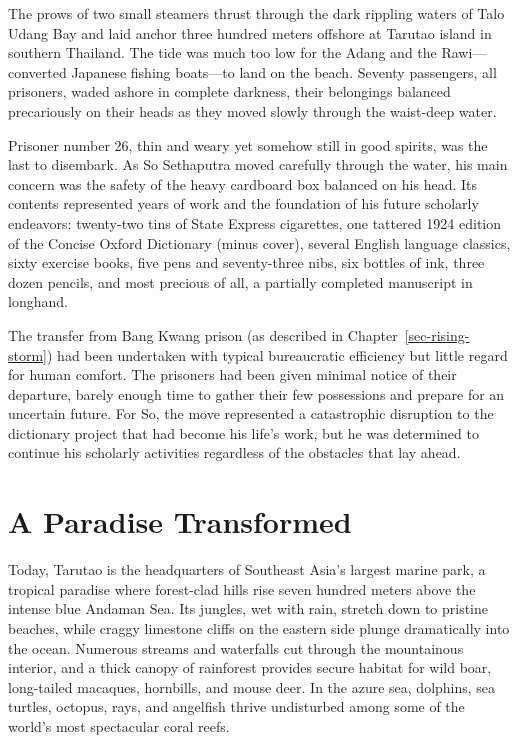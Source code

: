 \documentclass[
  Letterpaper,
]{scrbook}
\begin{document}
The prows of two small steamers thrust through the dark rippling waters
of Talo Udang Bay and laid anchor three hundred meters offshore at
Tarutao island in southern Thailand. The tide was much too low for the
Adang and the Rawi---converted Japanese fishing boats---to land on the
beach. Seventy passengers, all prisoners, waded ashore in complete
darkness, their belongings balanced precariously on their heads as they
moved slowly through the waist-deep water.

Prisoner number 26, thin and weary yet somehow still in good spirits,
was the last to disembark. As So Sethaputra moved carefully through the
water, his main concern was the safety of the heavy cardboard box
balanced on his head. Its contents represented years of work and the
foundation of his future scholarly endeavors: twenty-two tins of State
Express cigarettes, one tattered 1924 edition of the Concise Oxford
Dictionary (minus cover), several English language classics, sixty
exercise books, five pens and seventy-three nibs, six bottles of ink,
three dozen pencils, and most precious of all, a partially completed
manuscript in longhand.

The transfer from Bang Kwang prison (as described in
Chapter~\ref{sec-rising-storm}) had been undertaken with typical
bureaucratic efficiency but little regard for human comfort. The
prisoners had been given minimal notice of their departure, barely
enough time to gather their few possessions and prepare for an uncertain
future. For So, the move represented a catastrophic disruption to the
dictionary project that had become his life's work, but he was
determined to continue his scholarly activities regardless of the
obstacles that lay ahead.

\section{A Paradise Transformed}\label{a-paradise-transformed}

Today, Tarutao is the headquarters of Southeast Asia's largest marine
park, a tropical paradise where forest-clad hills rise seven hundred
meters above the intense blue Andaman Sea. Its jungles, wet with rain,
stretch down to pristine beaches, while craggy limestone cliffs on the
eastern side plunge dramatically into the ocean. Numerous streams and
waterfalls cut through the mountainous interior, and a thick canopy of
rainforest provides secure habitat for wild boar, long-tailed macaques,
hornbills, and mouse deer. In the azure sea, dolphins, sea turtles,
octopus, rays, and angelfish thrive undisturbed among some of the
world's most spectacular coral reefs.
\end{document}
